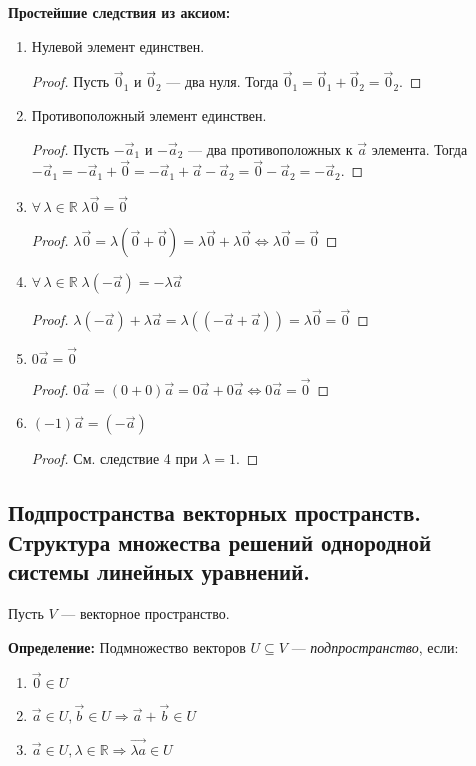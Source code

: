 \documentclass[a4paper, 12pt]{article}
\newcommand{\bbR}[0]{\mathbb{R}}
\begin{document}
\textbf{Простейшие следствия из аксиом:}
\begin{enumerate}
\item Нулевой элемент единствен.
\begin{proof}
Пусть $\vec{0}_1$ и $\vec{0}_2$ --- два нуля. Тогда $\vec{0}_1 = \vec{0}_1 + \vec{0}_2 = \vec{0}_2$.
\end{proof}
\item Противоположный элемент единствен.
\begin{proof}
Пусть $-\vec{a}_1$ и $-\vec{a}_2$ --- два противоположных к $\vec{a}$ элемента. Тогда $-\vec{a}_1 = -\vec{a}_1 + \vec{0} = -\vec{a}_1 + \vec{a} - \vec{a}_2 = \vec{0} -\vec{a}_2 = -\vec{a}_2$.
\end{proof}
\item $\forall\,\lambda \in \mathbb{R}\; \lambda\vec{0} = \vec{0}$
\begin{proof}
$\lambda\vec{0} = \lambda(\vec{0} + \vec{0}) = \lambda\vec{0} + \lambda\vec{0} \iff \lambda\vec{0} = \vec{0}$
\end{proof}
\item $\forall\,\lambda \in \mathbb{R}\;\lambda(-\vec{a}) = -\lambda\vec{a}$
\begin{proof}
$\lambda(-\vec{a}) + \lambda\vec{a} = \lambda((-\vec{a} + \vec{a})) = \lambda\vec{0} = \vec{0}$
\end{proof}
\item $0\vec{a} = \vec{0}$
\begin{proof}
$0\vec{a} = (0 + 0)\vec{a} = 0\vec{a} + 0\vec{a} \iff 0\vec{a} = \vec{0}$
\end{proof}
\item $(-1)\vec{a} = (-\vec{a})$
\begin{proof} См. следствие 4 при $\lambda = 1$. \end{proof}
\end{enumerate}

\subsection{Подпространства векторных пространств. Структура множества решений однородной системы линейных уравнений.}
Пусть $V$ --- векторное пространство.

\textbf{Определение:} Подмножество векторов $U \subseteq V$ --- \textit{подпространство}, если:
\begin{enumerate}
  \item $\vec{0} \in U$
  \item $\vec{a} \in U, \vec{b} \in U \Rightarrow \vec{a} + \vec{b} \in U$
  \item $\vec{a} \in U, \lambda \in \bbR \Rightarrow \vec{\lambda a} \in U$
\end{enumerate}
\end{document}
